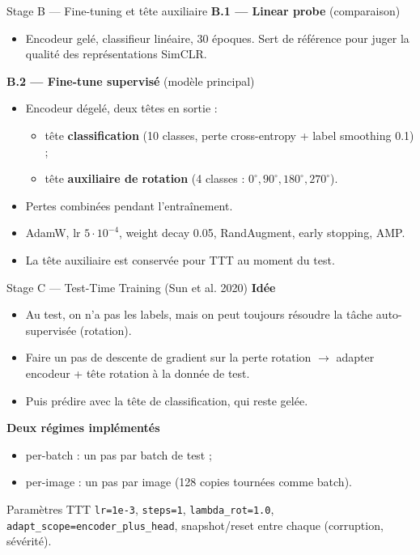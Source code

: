 \documentclass[10pt,aspectratio=169]{beamer}
\newcommand{\code}[1]{\texttt{\small #1}}
\begin{document}
\begin{frame}{Stage B --- Fine-tuning et tête auxiliaire}
  \textbf{B.1 --- Linear probe} (comparaison)
  \begin{itemize}\small
    \item Encodeur gelé, classifieur linéaire, 30 époques. Sert de référence pour juger la qualité des représentations SimCLR.
  \end{itemize}

  \vspace{0.4em}
  \textbf{B.2 --- Fine-tune supervisé} (modèle principal)
  \begin{itemize}
    \item Encodeur dégelé, deux têtes en sortie :
    \begin{itemize}
      \item tête \textbf{classification} (10 classes, perte cross-entropy + label smoothing 0.1) ;
      \item tête \textbf{auxiliaire de rotation} (4 classes : $0^\circ, 90^\circ, 180^\circ, 270^\circ$).
    \end{itemize}
    \item Pertes combinées pendant l'entraînement.
    \item AdamW, lr $5\!\cdot\!10^{-4}$, weight decay 0.05, RandAugment, early stopping, AMP.
    \item La tête auxiliaire est conservée \alert{pour TTT au moment du test}.
  \end{itemize}
\end{frame}

\begin{frame}{Stage C --- Test-Time Training (Sun et al. 2020)}
  \textbf{Idée}
  \begin{itemize}
    \item Au test, on n'a pas les labels, mais on peut toujours résoudre la tâche auto-supervisée (rotation).
    \item Faire un pas de descente de gradient sur la perte rotation $\to$ adapter encodeur + tête rotation à la donnée de test.
    \item Puis prédire avec la tête de classification, qui reste gelée.
  \end{itemize}

  \vspace{0.3em}
  \textbf{Deux régimes implémentés}
  \begin{itemize}
    \item \alert{per-batch} : un pas par batch de test ;
    \item \alert{per-image} : un pas par image (128 copies tournées comme batch).
  \end{itemize}

  \vspace{0.3em}
  \begin{block}{Paramètres TTT}
    \small \code{lr=1e-3}, \code{steps=1}, \code{lambda\_rot=1.0}, \code{adapt\_scope=encoder\_plus\_head}, snapshot/reset entre chaque (corruption, sévérité).
  \end{block}
\end{frame}
\end{document}
